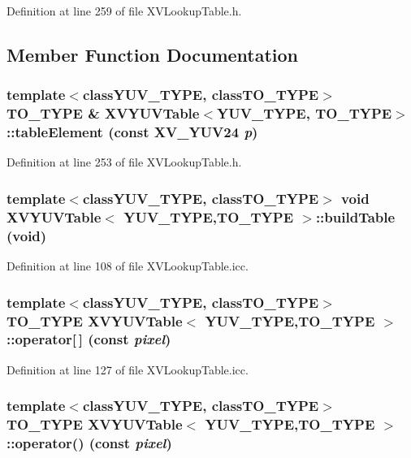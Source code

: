Definition at line 259 of file XVLookup\-Table.h.

\subsection{Member Function Documentation}
\label{XVYUVTable_b1}
\hypertarget{class_XVYUVTable_b1}{
\subsubsection[tableElement]{\setlength{\rightskip}{0pt plus 5cm}template$<$classYUV\_\-TYPE, classTO\_\-TYPE$>$ TO\_\-TYPE \& XVYUVTable$<$YUV\_\-TYPE, TO\_\-TYPE$>$::table\-Element (const XV\_\-YUV24 {\em p})}}




Definition at line 253 of file XVLookup\-Table.h.\label{XVYUVTable_a1}
\hypertarget{class_XVYUVTable_a1}{
\subsubsection[buildTable]{\setlength{\rightskip}{0pt plus 5cm}template$<$classYUV\_\-TYPE, classTO\_\-TYPE$>$ void XVYUVTable$<$ YUV\_\-TYPE,TO\_\-TYPE $>$::build\-Table (void)}}




Definition at line 108 of file XVLookup\-Table.icc.\label{XVYUVTable_a2}
\hypertarget{class_XVYUVTable_a2}{
\subsubsection[operator{}]{\setlength{\rightskip}{0pt plus 5cm}template$<$classYUV\_\-TYPE, classTO\_\-TYPE$>$ TO\_\-TYPE XVYUVTable$<$ YUV\_\-TYPE,TO\_\-TYPE $>$::operator\mbox{[}$\,$\mbox{]} (const {\em pixel})}}




Definition at line 127 of file XVLookup\-Table.icc.\label{XVYUVTable_a3}
\hypertarget{class_XVYUVTable_a3}{
\subsubsection[operator()]{\setlength{\rightskip}{0pt plus 5cm}template$<$classYUV\_\-TYPE, classTO\_\-TYPE$>$ TO\_\-TYPE XVYUVTable$<$ YUV\_\-TYPE,TO\_\-TYPE $>$::operator() (const {\em pixel})}}





